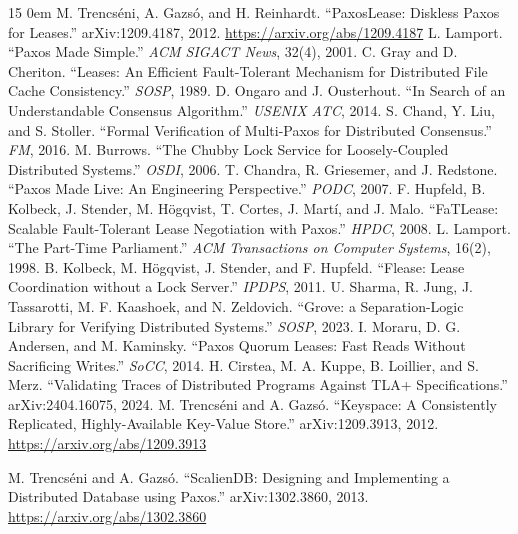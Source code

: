 \documentclass[final,5p,times,twocolumn,number]{elsarticle}
\begin{document}
\begin{thebibliography}{15}
\itemsep0em
 M. Trencs\'eni, A. Gazs\'o, and H. Reinhardt. ``PaxosLease: Diskless Paxos for Leases.'' arXiv:1209.4187, 2012. \url{https://arxiv.org/abs/1209.4187}
 L. Lamport. ``Paxos Made Simple.'' \textit{ACM SIGACT News}, 32(4), 2001.
 C. Gray and D. Cheriton. ``Leases: An Efficient Fault-Tolerant Mechanism for Distributed File Cache Consistency.'' \textit{SOSP}, 1989.
 D. Ongaro and J. Ousterhout. ``In Search of an Understandable Consensus Algorithm.'' \textit{USENIX ATC}, 2014.
 S. Chand, Y. Liu, and S. Stoller. ``Formal Verification of Multi-Paxos for Distributed Consensus.'' \textit{FM}, 2016.
 M. Burrows. ``The Chubby Lock Service for Loosely-Coupled Distributed Systems.'' \textit{OSDI}, 2006.
 T. Chandra, R. Griesemer, and J. Redstone. ``Paxos Made Live: An Engineering Perspective.'' \textit{PODC}, 2007.
 F. Hupfeld, B. Kolbeck, J. Stender, M. H\"ogqvist, T. Cortes, J. Mart\'i, and J. Malo. ``FaTLease: Scalable Fault-Tolerant Lease Negotiation with Paxos.'' \textit{HPDC}, 2008.
 L. Lamport. ``The Part-Time Parliament.'' \textit{ACM Transactions on Computer Systems}, 16(2), 1998.
 B. Kolbeck, M. H\"ogqvist, J. Stender, and F. Hupfeld. ``Flease: Lease Coordination without a Lock Server.'' \textit{IPDPS}, 2011.
 U. Sharma, R. Jung, J. Tassarotti, M. F. Kaashoek, and N. Zeldovich. ``Grove: a Separation-Logic Library for Verifying Distributed Systems.'' \textit{SOSP}, 2023.
 I. Moraru, D. G. Andersen, and M. Kaminsky. ``Paxos Quorum Leases: Fast Reads Without Sacrificing Writes.'' \textit{SoCC}, 2014.
 H. Cirstea, M. A. Kuppe, B. Loillier, and S. Merz. ``Validating Traces of Distributed Programs Against TLA+ Specifications.'' arXiv:2404.16075, 2024.
 M. Trencs\'eni and A. Gazs\'o. ``Keyspace: A Consistently Replicated, Highly-Available Key-Value Store.'' arXiv:1209.3913, 2012. \url{https://arxiv.org/abs/1209.3913}

 M. Trencs\'eni and A. Gazs\'o. ``ScalienDB: Designing and Implementing a Distributed Database using Paxos.'' arXiv:1302.3860, 2013. \url{https://arxiv.org/abs/1302.3860}
\end{thebibliography}
\end{document}
